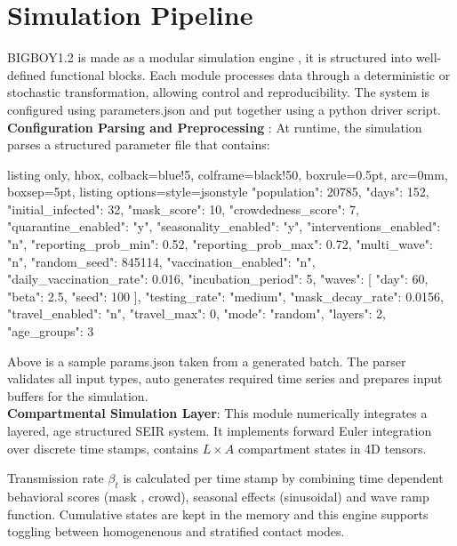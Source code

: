 \documentclass[11pt,a4paper]{article}
\theoremstyle{remark}\newtheorem{remark}{Remark}
\begin{document}
\section{Simulation Pipeline}
BIGBOY1.2 is made as a modular simulation engine , it is structured into well-defined functional blocks. Each module processes data through a deterministic or stochastic transformation, allowing control and reproducibility. The system is configured using parameters.json and put together using a python driver script. \\
\textbf{Configuration Parsing and Preprocessing} : At runtime, the simulation parses a structured parameter file that contains: 
\begin{center}
\begin{tcblisting}{
  listing only,
  hbox,
  colback=blue!5,
  colframe=black!50,
  boxrule=0.5pt,
  arc=0mm,
  boxsep=5pt,
  listing options={style=jsonstyle}
}
{
    "population": 20785,
    "days": 152,
    "initial_infected": 32,
    "mask_score": 10,
    "crowdedness_score": 7,
    "quarantine_enabled": "y",
    "seasonality_enabled": "y",
    "interventions_enabled": "n",
    "reporting_prob_min": 0.52,
    "reporting_prob_max": 0.72,
    "multi_wave": "n",
    "random_seed": 845114,
    "vaccination_enabled": "n",
    "daily_vaccination_rate": 0.016,
    "incubation_period": 5,
    "waves": [
        {
            "day": 60,
            "beta": 2.5,
            "seed": 100
        }
    ],
    "testing_rate": "medium",
    "mask_decay_rate": 0.0156,
    "travel_enabled": "n",
    "travel_max": 0,
    "mode": "random",
    "layers": 2,
    "age_groups": 3
}
\end{tcblisting}
\end{center}
Above is a sample params.json taken from a generated batch. The parser validates all input types, auto generates required time series and prepares input buffers for the simulation. \\
\textbf{Compartmental Simulation Layer}: This module numerically integrates a layered, age structured SEIR system. It implements forward Euler integration over discrete time stamps, contains $L \times A$ compartment states in 4D tensors.
\begin{center}
\end{center}
Transmission rate $\beta_t$ is calculated per time stamp by combining time dependent behavioral scores (mask , crowd), seasonal effects (sinusoidal) and wave ramp function. Cumulative states are kept in the memory and this engine supports toggling between homogenenous and stratified contact modes.\\
\end{document}

